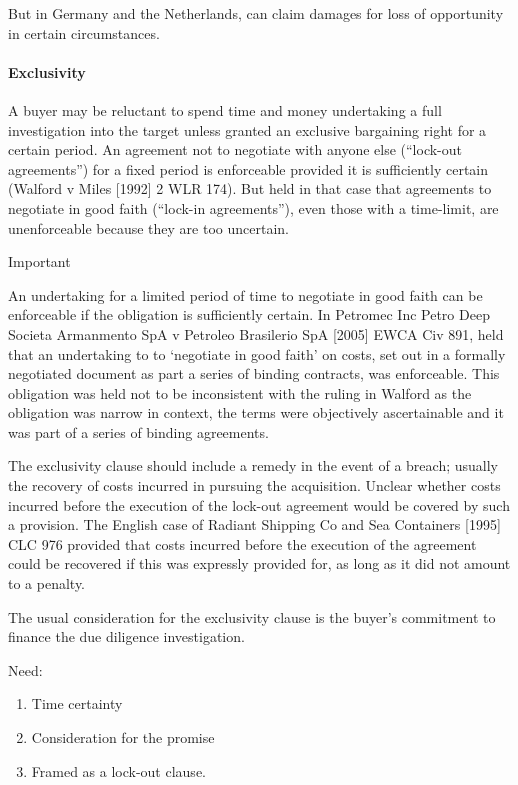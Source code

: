 \documentclass[
]{article}
\providecommand{\tightlist}{%
  \setlength{\itemsep}{0pt}\setlength{\parskip}{0pt}}
\begin{document}
But in Germany and the Netherlands, can claim damages for loss of
opportunity in certain circumstances.

\hypertarget{exclusivity}{%
\paragraph{Exclusivity}\label{exclusivity}}

A buyer may be reluctant to spend time and money undertaking a full
investigation into the target unless granted an exclusive bargaining
right for a certain period. An agreement not to negotiate with anyone
else (``lock-out agreements'') for a fixed period is enforceable
provided it is sufficiently certain (Walford v Miles {[}1992{]} 2 WLR
174). But held in that case that agreements to negotiate in good faith
(``lock-in agreements''), even those with a time-limit, are
unenforceable because they are too uncertain.

Important

An undertaking for a limited period of time to negotiate in good faith
can be enforceable if the obligation is sufficiently certain. In
Petromec Inc Petro Deep Societa Armanmento SpA v Petroleo Brasilerio SpA
{[}2005{]} EWCA Civ 891, held that an undertaking to to `negotiate in
good faith' on costs, set out in a formally negotiated document as part
a series of binding contracts, was enforceable. This obligation was held
not to be inconsistent with the ruling in Walford as the obligation was
narrow in context, the terms were objectively ascertainable and it was
part of a series of binding agreements.

The exclusivity clause should include a remedy in the event of a breach;
usually the recovery of costs incurred in pursuing the acquisition.
Unclear whether costs incurred before the execution of the lock-out
agreement would be covered by such a provision. The English case of
Radiant Shipping Co and Sea Containers {[}1995{]} CLC 976 provided that
costs incurred before the execution of the agreement could be recovered
if this was expressly provided for, as long as it did not amount to a
penalty.

The usual consideration for the exclusivity clause is the buyer's
commitment to finance the due diligence investigation.

Need:

\begin{enumerate}
\tightlist
\item
  Time certainty
\item
  Consideration for the promise
\item
  Framed as a lock-out clause.
\end{enumerate}
\end{document}
